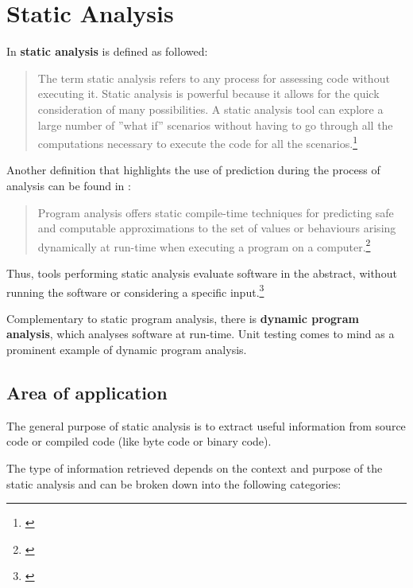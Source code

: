 \chapter{Static Analysis}
\label{chap:StaticAnalysis}

In  \textbf{static analysis} is defined as followed:

\begin{quotation}
The term static analysis refers to any process for assessing code without
executing it. Static analysis is powerful because it allows for the quick consideration of many possibilities. A static analysis tool can explore a large number of ''what if'' scenarios without having to go through all the computations
necessary to execute the code for all the scenarios.\footnote{\citep[3]{SecureProgramming}}
\end{quotation}

Another definition that highlights the use of prediction during the process of analysis can be found in :

\begin{quotation}
Program analysis offers static compile-time techniques for predicting safe and computable approximations to the set of values or behaviours arising dynamically at run-time when executing a program on a computer.\footnote{\citep[1]{ProgramAnalysis}}
\end{quotation}

Thus, tools performing static analysis evaluate software in the abstract, without running the software or considering a specific input.\footnote{\citep[1]{UsingSAToFindBugs}}

Complementary to static program analysis, there is \textbf{dynamic program analysis}, which analyses software at run-time. Unit testing comes to mind as a prominent example of dynamic program analysis.

\newpage
\section{Area of application}
\label{sec:AreaOfApplication}

The general purpose of static analysis is to extract useful information from source code or compiled code (like byte code or binary code).

The type of information retrieved depends on the context and purpose of the static analysis and can be broken down into the following categories:

